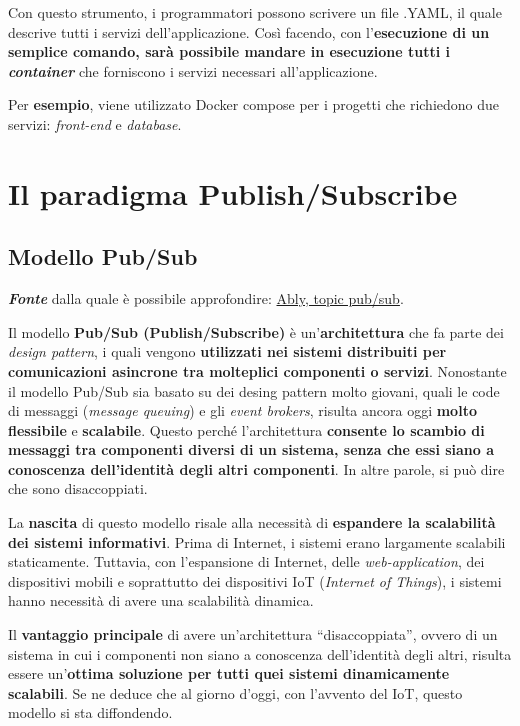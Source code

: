 \documentclass[a4paper]{article}
\newcommand{\dquotes}[1]{``#1''}
\begin{document}
	\noindent
	Con questo strumento, i programmatori possono scrivere un file .YAML, il quale descrive tutti i servizi dell'applicazione. Così facendo, con l'\textbf{esecuzione di un semplice comando, sarà possibile mandare in esecuzione tutti i \emph{container}} che forniscono i servizi necessari all'applicazione. 
	
	Per \textcolor{Green4}{\textbf{esempio}}, viene utilizzato Docker compose per i progetti che richiedono due servizi: \emph{front-end} e \emph{database}.\newpage
	
	\section{Il paradigma Publish/Subscribe}
	
	\subsection{Modello Pub/Sub}
	
	\emph{\textbf{Fonte}} dalla quale è possibile approfondire: \href{https://ably.com/topic/pub-sub}{Ably, topic pub/sub}.\newline
	
	\noindent
	Il modello \textcolor{Red3}{\textbf{Pub/Sub (Publish/Subscribe)}} è un'\textbf{architettura} che fa parte dei \emph{design pattern}, i quali vengono \textbf{utilizzati nei sistemi distribuiti per comunicazioni asincrone tra molteplici componenti o servizi}. Nonostante il modello Pub/Sub sia basato su dei desing pattern molto giovani, quali le code di messaggi (\emph{message queuing}) e gli \emph{event brokers}, risulta ancora oggi \textbf{molto flessibile} e \textbf{scalabile}. Questo perché l'architettura \textbf{consente lo scambio di messaggi tra componenti diversi di un sistema, senza che essi siano a conoscenza dell'identità degli altri componenti}. In altre parole, si può dire che sono disaccoppiati.\newline
	
	\noindent
	La \textbf{nascita} di questo modello risale alla necessità di \textbf{espandere la scalabilità dei sistemi informativi}. Prima di Internet, i sistemi erano largamente scalabili staticamente. Tuttavia, con l'espansione di Internet, delle \emph{web-application}, dei dispositivi mobili e soprattutto dei dispositivi IoT (\emph{Internet of Things}), i sistemi hanno necessità di avere una scalabilità dinamica.\newline
	
	\noindent
	Il \textcolor{Green4}{\textbf{vantaggio principale}} di avere un'architettura \dquotes{disaccoppiata}, ovvero di un sistema in cui i componenti non siano a conoscenza dell'identità degli altri, risulta essere un'\textbf{ottima soluzione per tutti quei sistemi dinamicamente scalabili}. Se ne deduce che al giorno d'oggi, con l'avvento del IoT, questo modello si sta diffondendo.\newline
	
\end{document}
